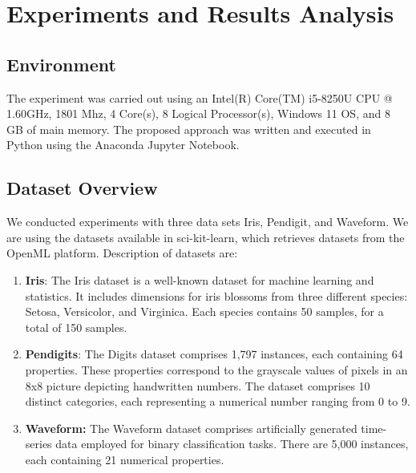\chapter{Experiments and Results Analysis}
\section{Environment}
The experiment was carried out using an Intel(R) Core(TM) i5-8250U CPU @ 1.60GHz, 1801 Mhz, 4 Core(s), 8 Logical Processor(s), Windows 11 OS, and 8 GB of main memory. The proposed approach was written and executed in Python using the Anaconda Jupyter Notebook.

\section{Dataset Overview}
We conducted experiments with three data sets Iris, Pendigit, and Waveform. We are using the datasets available in sci-kit-learn, which retrieves datasets from the OpenML platform. Description of datasets are:
\begin{enumerate}
    \item \textbf{Iris}: The Iris dataset is a well-known dataset for machine learning and statistics. It includes dimensions for iris blossoms from three different species: Setosa, Versicolor, and Virginica. Each species contains 50 samples, for a total of 150 samples.
    \item \textbf{Pendigits}: The Digits dataset comprises 1,797 instances, each containing 64 properties. These properties correspond to the grayscale values of pixels in an 8x8 picture depicting handwritten numbers. The dataset comprises 10 distinct categories, each representing a numerical number ranging from 0 to 9.
    \item \textbf{ Waveform:} The Waveform dataset comprises artificially generated time-series data employed for binary classification tasks. There are 5,000 instances, each containing 21 numerical properties.
\end{enumerate}

